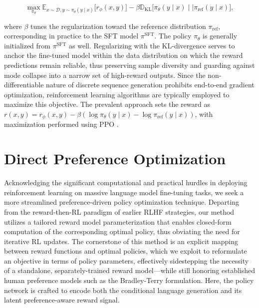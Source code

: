 \begin{equation}\label{eq:RL}
\max_{\pi_{\theta}}  \mathbb{E}_{x\sim \mathcal{D}, y\sim \pi_{\theta}(y \mid x)}\bigl[r_{\phi}(x, y)\bigr] - \beta\mathbb{D}_{\textrm{KL}}\bigl[\pi_{\theta}(y\mid x)\mid \mid \pi_\text{ref}(y\mid x)\bigr],
\end{equation}

where $\beta$ tunes the regularization toward the reference distribution $\pi_\text{ref}$, corresponding in practice to the SFT model $\pi^\text{SFT}$. The policy $\pi_\theta$ is generally initialized from $\pi^\text{SFT}$ as well. Regularizing with the KL-divergence serves to anchor the fine-tuned model within the data distribution on which the reward predictions remain reliable, thus preserving sample diversity and guarding against mode collapse into a narrow set of high-reward outputs. Since the non-differentiable nature of discrete sequence generation prohibits end-to-end gradient optimization, reinforcement learning algorithms are typically employed to maximize this objective. The prevalent approach \citep{ziegler2020finetuning, stiennon2022learning, bai2022training, ouyang2022training} sets the reward as ${r(x, y) = r_{\phi}(x, y) -\beta (\log \pi_{\theta}(y\mid x) - \log \pi_\text{ref}(y\mid x))}$, with maximization performed using PPO \cite{schulman2017proximal}.

\section{Direct Preference Optimization}\label{sec:DPO}

Acknowledging the significant computational and practical hurdles in deploying reinforcement learning on massive language model fine-tuning tasks, we seek a more streamlined preference-driven policy optimization technique. Departing from the reward-then-RL paradigm of earlier RLHF strategies, our method utilizes a tailored reward model parameterization that enables closed-form computation of the corresponding optimal policy, thus obviating the need for iterative RL updates. The cornerstone of this method is an explicit mapping between reward functions and optimal policies, which we exploit to reformulate an objective in terms of policy parameters, effectively sidestepping the necessity of a standalone, separately-trained reward model—while still honoring established human preference models such as the Bradley-Terry formulation. Here, the policy network is crafted to encode both the conditional language generation and its latent preference-aware reward signal.

